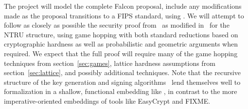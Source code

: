 The project will model the complete Falcon proposal, include any modifications made as the proposal transitions to a FIPS standard, using \vcvio.  We will attempt to follow as closely as possible the security proof from~\cite{GPV} as modified in~\cite{fouque2018falcon} for the NTRU structure, using game hopping with both standard reductions based on cryptographic hardness as well as probabilistic and geometric arguments when required. 
We expect that the full proof will require many of the game hopping techniques from section~\ref{sec:games}, lattice hardness assumptions from section~\ref{sec:lattice}, and possibly additional techniques.  
Note that the recursive structure of the key generation and signing algorithms~\cite{fouque2018falcon} lend themselves well to formalization in a shallow, functional embedding like \vcvio, in contrast to the more imperative-oriented embeddings of tools like EasyCrypt and FIXME.




